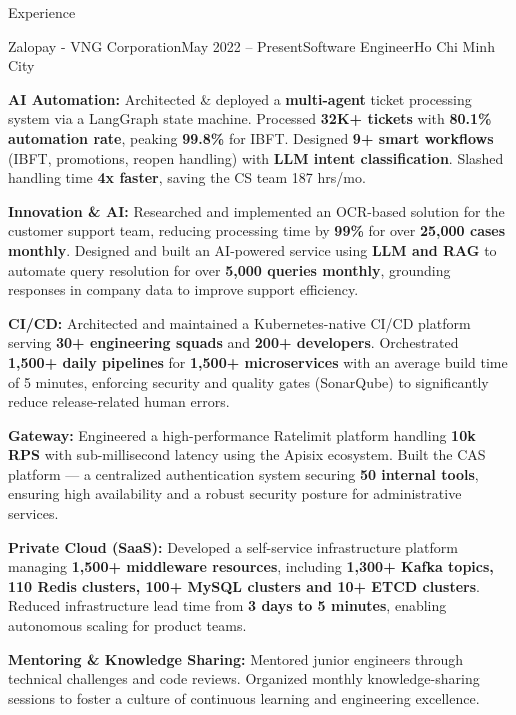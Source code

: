 \documentclass{resume} %
\begin{document}
\begin{rSection}{Experience}

    \begin{rSubsection}{Zalopay - VNG Corporation}{May 2022 -- Present}{Software Engineer}{Ho Chi Minh City}
        \item \textbf{AI Automation:} Architected \& deployed a \textbf{multi-agent} ticket processing system via a LangGraph state machine. Processed \textbf{32K+ tickets} with \textbf{80.1\% automation rate}, peaking \textbf{99.8\%} for IBFT. Designed \textbf{9+ smart workflows} (IBFT, promotions, reopen handling) with \textbf{LLM intent classification}. Slashed handling time \textbf{4x faster}, saving the CS team 187 hrs/mo.
        \item \textbf{Innovation \& AI:} Researched and implemented an OCR-based solution for the customer support team, reducing processing time by \textbf{99\%} for over \textbf{25,000 cases monthly}. Designed and built an AI-powered service using \textbf{LLM and RAG} to automate query resolution for over \textbf{5,000 queries monthly}, grounding responses in company data to improve support efficiency.
        \item \textbf{CI/CD:} Architected and maintained a Kubernetes-native CI/CD platform serving \textbf{30+ engineering squads} and \textbf{200+ developers}. Orchestrated \textbf{1,500+ daily pipelines} for \textbf{1,500+ microservices} with an average build time of 5 minutes, enforcing security and quality gates (SonarQube) to significantly reduce release-related human errors.
        \item \textbf{Gateway:} Engineered a high-performance Ratelimit platform handling \textbf{10k RPS} with sub-millisecond latency using the Apisix ecosystem. Built the CAS platform — a centralized authentication system securing \textbf{50 internal tools}, ensuring high availability and a robust security posture for administrative services.
        \item \textbf{Private Cloud (SaaS):} Developed a self-service infrastructure platform managing \textbf{1,500+ middleware resources}, including \textbf{1,300+ Kafka topics, 110 Redis clusters, 100+ MySQL clusters and 10+ ETCD clusters}. Reduced infrastructure lead time from \textbf{3 days to 5 minutes}, enabling autonomous scaling for product teams.
        \item \textbf{Mentoring \& Knowledge Sharing:} Mentored junior engineers through technical challenges and code reviews. Organized monthly knowledge-sharing sessions to foster a culture of continuous learning and engineering excellence.
    \end{rSubsection}


\end{rSection}
\end{document}
